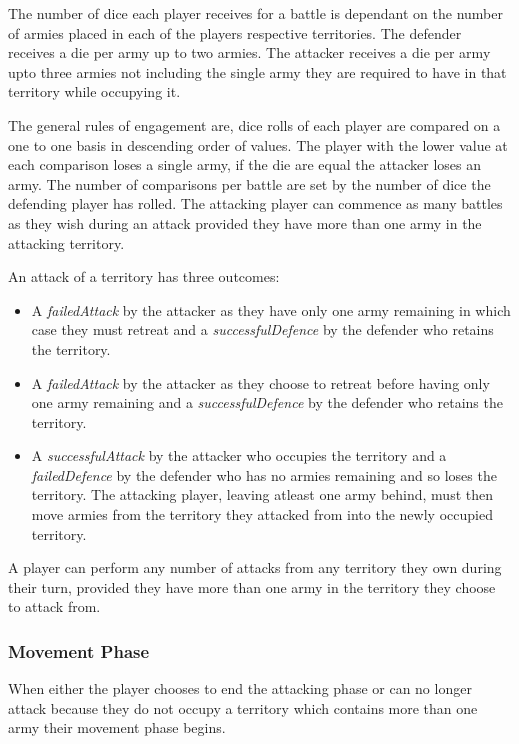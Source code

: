 \documentclass[parskip]{cs4rep}
\begin{document}
The number of dice each player receives for a battle is dependant on the number of armies placed in each of the players respective territories. The defender receives a die per army up to two armies. The attacker receives a die per army upto three armies not including the single army they are required to have in that territory while occupying it. 

The general rules of engagement are, dice rolls of each player are compared on a one to one basis in descending order of values. The player with the lower value at each comparison loses a single army, if the die are equal the attacker loses an army. The number of comparisons per battle are set by the number of dice the defending player has rolled. The attacking player can commence as many battles as they wish during an attack provided they have more than one army in the attacking territory.

An attack of a territory has three outcomes:

\begin{itemize}
\item
A \textit{failedAttack} by the attacker as they have only one army remaining in which case they must retreat and a \textit{successfulDefence} by the defender who retains the territory.
\item
A \textit{failedAttack} by the attacker as they choose to retreat before having only one army remaining and a \textit{successfulDefence} by the defender who retains the territory.
\item
A \textit{successfulAttack} by the attacker who occupies the territory and a \textit{failedDefence} by the defender who has no armies remaining and so loses the territory. The attacking player, leaving atleast one army behind, must then move armies from the territory they attacked from into the newly occupied territory.
\end{itemize}

A player can perform any number of attacks from any territory they own during their turn, provided they have more than one army in the territory they choose to attack from.

\subsubsection{Movement Phase}

When either the player chooses to end the attacking phase or can no longer attack because they do not occupy a territory which contains more than one army their movement phase begins.
\end{document}
